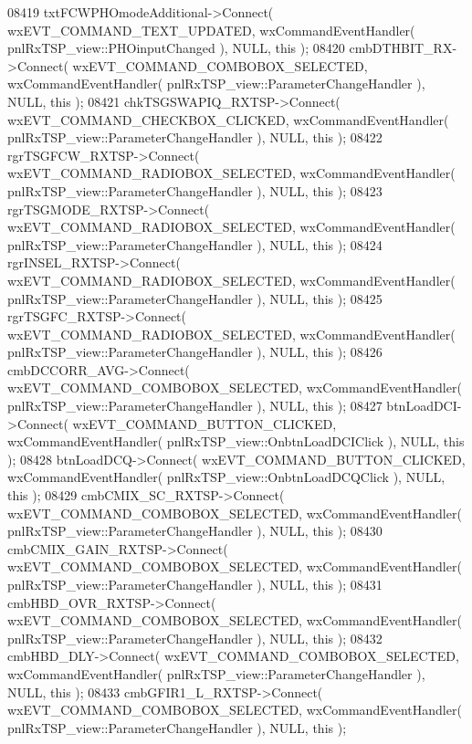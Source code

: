 \begin{DoxyCode}
08419     txtFCWPHOmodeAdditional->Connect( wxEVT\_COMMAND\_TEXT\_UPDATED, wxCommandEventHandler( 
      pnlRxTSP_view::PHOinputChanged ), NULL, \textcolor{keyword}{this} );
08420     cmbDTHBIT_RX->Connect( wxEVT\_COMMAND\_COMBOBOX\_SELECTED, wxCommandEventHandler( 
      pnlRxTSP_view::ParameterChangeHandler ), NULL, \textcolor{keyword}{this} );
08421     chkTSGSWAPIQ_RXTSP->Connect( wxEVT\_COMMAND\_CHECKBOX\_CLICKED, wxCommandEventHandler( 
      pnlRxTSP_view::ParameterChangeHandler ), NULL, \textcolor{keyword}{this} );
08422     rgrTSGFCW_RXTSP->Connect( wxEVT\_COMMAND\_RADIOBOX\_SELECTED, wxCommandEventHandler( 
      pnlRxTSP_view::ParameterChangeHandler ), NULL, \textcolor{keyword}{this} );
08423     rgrTSGMODE_RXTSP->Connect( wxEVT\_COMMAND\_RADIOBOX\_SELECTED, wxCommandEventHandler( 
      pnlRxTSP_view::ParameterChangeHandler ), NULL, \textcolor{keyword}{this} );
08424     rgrINSEL_RXTSP->Connect( wxEVT\_COMMAND\_RADIOBOX\_SELECTED, wxCommandEventHandler( 
      pnlRxTSP_view::ParameterChangeHandler ), NULL, \textcolor{keyword}{this} );
08425     rgrTSGFC_RXTSP->Connect( wxEVT\_COMMAND\_RADIOBOX\_SELECTED, wxCommandEventHandler( 
      pnlRxTSP_view::ParameterChangeHandler ), NULL, \textcolor{keyword}{this} );
08426     cmbDCCORR_AVG->Connect( wxEVT\_COMMAND\_COMBOBOX\_SELECTED, wxCommandEventHandler( 
      pnlRxTSP_view::ParameterChangeHandler ), NULL, \textcolor{keyword}{this} );
08427     btnLoadDCI->Connect( wxEVT\_COMMAND\_BUTTON\_CLICKED, wxCommandEventHandler( 
      pnlRxTSP_view::OnbtnLoadDCIClick ), NULL, \textcolor{keyword}{this} );
08428     btnLoadDCQ->Connect( wxEVT\_COMMAND\_BUTTON\_CLICKED, wxCommandEventHandler( 
      pnlRxTSP_view::OnbtnLoadDCQClick ), NULL, \textcolor{keyword}{this} );
08429     cmbCMIX_SC_RXTSP->Connect( wxEVT\_COMMAND\_COMBOBOX\_SELECTED, wxCommandEventHandler( 
      pnlRxTSP_view::ParameterChangeHandler ), NULL, \textcolor{keyword}{this} );
08430     cmbCMIX_GAIN_RXTSP->Connect( wxEVT\_COMMAND\_COMBOBOX\_SELECTED, wxCommandEventHandler( 
      pnlRxTSP_view::ParameterChangeHandler ), NULL, \textcolor{keyword}{this} );
08431     cmbHBD_OVR_RXTSP->Connect( wxEVT\_COMMAND\_COMBOBOX\_SELECTED, wxCommandEventHandler( 
      pnlRxTSP_view::ParameterChangeHandler ), NULL, \textcolor{keyword}{this} );
08432     cmbHBD_DLY->Connect( wxEVT\_COMMAND\_COMBOBOX\_SELECTED, wxCommandEventHandler( 
      pnlRxTSP_view::ParameterChangeHandler ), NULL, \textcolor{keyword}{this} );
08433     cmbGFIR1_L_RXTSP->Connect( wxEVT\_COMMAND\_COMBOBOX\_SELECTED, wxCommandEventHandler( 
      pnlRxTSP_view::ParameterChangeHandler ), NULL, \textcolor{keyword}{this} );

\end{DoxyCode}
